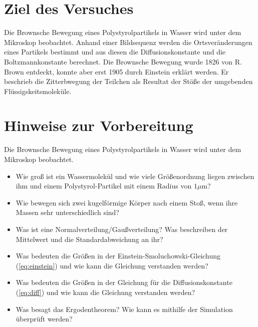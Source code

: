 \section*{Ziel des Versuches}

Die Brownsche Bewegung eines Polystyrolpartikels in Wasser wird unter dem Mikroskop beobachtet. Anhand einer Bildsequenz werden die Ortsveränderungen eines Partikels bestimmt und aus diesen die Diffusionskonstante und die Boltzmannkonstante berechnet. Die Brownsche Bewegung wurde 1826 von R. Brown entdeckt, konnte aber erst 1905 durch Einstein erklärt werden. Er beschrieb die Zitterbwegung der Teilchen als Resultat der Stöße der umgebenden Flüssigskeitsmoleküle.

\section*{Hinweise zur Vorbereitung}
Die Brownsche Bewegung eines Polystyrolpartikels in Wasser wird unter dem Mikroskop beobachtet.
\begin{itemize}
  \item Wie groß ist ein Wassermolekül und wie viele Größenordnung liegen zwischen ihm und einem Polystyrol-Partikel mit einem Radius von $1 \mu$m?
  \item Wie bewegen sich zwei kugelförmige Körper nach einem Stoß, wenn ihre Massen sehr unterschiedlich sind?
  \item Was ist eine Normalverteilung/Gaußverteilung? Was beschreiben der Mittelwert und die Standardabweichung an ihr?
  \item Was bedeuten die Größen in der Einstein-Smoluchowski-Gleichung (\ref{eq:einstein}) und wie kann die Gleichung verstanden werden?
  \item Was bedeuten die Größen in der Gleichung für die Diffusionskonstante (\ref{eq:diff}) und wie kann die Gleichung verstanden werden?
  \item Was besagt das Ergodentheorem? Wie kann es mithilfe der Simulation überprüft werden?
\end{itemize}
